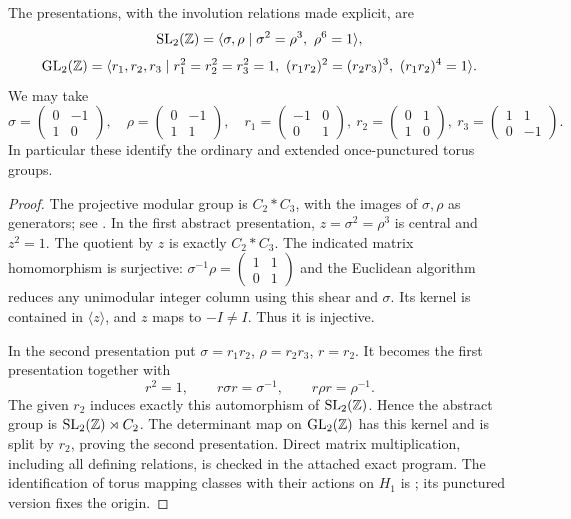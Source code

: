 \begin{theorem}\label{A6-matrix-presentations}
The presentations, with the involution relations made explicit, are
\[
 \operatorname{SL}_2({\mathbb{Z}})
 =\langle \sigma,\rho\mid \sigma^2=\rho^3,\ \rho^6=1\rangle,
\]
\[
 \operatorname{GL}_2({\mathbb{Z}})
 =\langle r_1,r_2,r_3\mid
 r_1^2=r_2^2=r_3^2=1,\
 (r_1r_2)^2=(r_2r_3)^3,\
 (r_1r_2)^4=1\rangle.
\]
We may take
\[
 \sigma=\begin{pmatrix}0&-1\\1&0\end{pmatrix},\quad
 \rho=\begin{pmatrix}0&-1\\1&1\end{pmatrix},\quad
 r_1=\begin{pmatrix}-1&0\\0&1\end{pmatrix},\
 r_2=\begin{pmatrix}0&1\\1&0\end{pmatrix},\
 r_3=\begin{pmatrix}1&1\\0&-1\end{pmatrix}.
\]
In particular these identify the ordinary and extended once-punctured torus groups.
\end{theorem}
\begin{proof}
The projective modular group is $C_2*C_3$, with the images of $\sigma,\rho$ as generators; see \cite[Appendix C, Theorem C.1]{ConradSL2A567}. In the first abstract presentation, $z=\sigma^2=\rho^3$ is central and $z^2=1$. The quotient by $z$ is exactly $C_2*C_3$. The indicated matrix homomorphism is surjective: $\sigma^{-1}\rho=\left(\begin{smallmatrix}1&1\\0&1\end{smallmatrix}\right)$ and the Euclidean algorithm reduces any unimodular integer column using this shear and $\sigma$. Its kernel is contained in $\langle z\rangle$, and $z$ maps to $-I\ne I$. Thus it is injective.

In the second presentation put $\sigma=r_1r_2$, $\rho=r_2r_3$, $r=r_2$. It becomes the first presentation together with
\[
 r^2=1,\qquad r\sigma r=\sigma^{-1},\qquad r\rho r=\rho^{-1}.
\]
The given $r_2$ induces exactly this automorphism of $\operatorname{SL}_2({\mathbb{Z}})$. Hence the abstract group is $\operatorname{SL}_2({\mathbb{Z}})\rtimes C_2$. The determinant map on $\operatorname{GL}_2({\mathbb{Z}})$ has this kernel and is split by $r_2$, proving the second presentation. Direct matrix multiplication, including all defining relations, is checked in the attached exact program. The identification of torus mapping classes with their actions on $H_1$ is \cite[Theorem 2.5 and \S2.2.4]{FarbMargalit2012A567}; its punctured version fixes the origin.
\end{proof}

